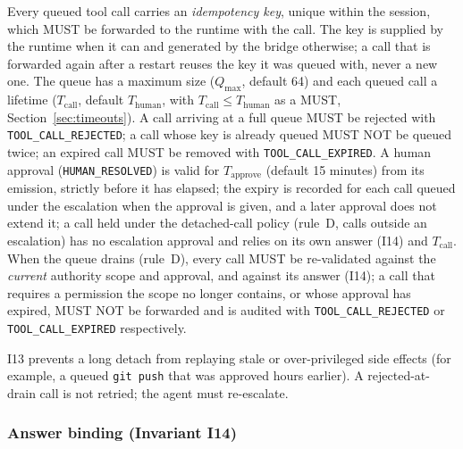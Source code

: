 \begin{invariant}\label{inv:I13}
Every queued tool call carries an \emph{idempotency key}, unique within
the session, which MUST be forwarded to the runtime with the call. The
key is supplied by the runtime when it can and generated by the bridge
otherwise; a call that is forwarded again after a restart reuses the
key it was queued with, never a new one. The
queue has a maximum size ($Q_{\max}$, default 64) and each queued call a
lifetime ($T_{\text{call}}$, default $T_{\text{human}}$, with
$T_{\text{call}} \leq T_{\text{human}}$ as a
MUST, Section~\ref{sec:timeouts}). A call arriving at a full
queue MUST be rejected with \texttt{TOOL\_CALL\_REJECTED}; a call whose
key is already queued MUST NOT be queued twice; an expired call MUST be
removed with \texttt{TOOL\_CALL\_EXPIRED}. A human approval
(\texttt{HUMAN\_RESOLVED}) is valid for $T_{\text{approve}}$ (default
15 minutes) from its emission, strictly before it has elapsed; the expiry is
recorded for each call queued under the escalation when the approval is
given, and a later approval does not extend it; a call held under the detached-call
policy (rule~D, calls outside an escalation) has no escalation approval
and relies on its own answer (I14) and $T_{\text{call}}$. When the queue drains (rule~D), every
call MUST be re-validated against the \emph{current} authority scope and
approval, and against its answer (I14); a call that requires a permission the scope no longer
contains, or whose approval has expired, MUST NOT be forwarded and is
audited with \texttt{TOOL\_CALL\_REJECTED} or \texttt{TOOL\_CALL\_EXPIRED}
respectively.
\end{invariant}

I13 prevents a long detach from replaying stale or over-privileged side
effects (for example, a queued \texttt{git push} that was approved
hours earlier). A rejected-at-drain call is not retried; the agent must
re-escalate.

\subsubsection{Answer binding (Invariant I14)}
\label{sec:invariants-answer}

